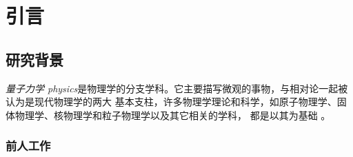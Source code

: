 \chapter{引言}


\section{研究背景}

\emph{量子力学 physics}是物理学的分支学科。它主要描写微观的事物，与相对论一起被认为是现代物理学的两大
基本支柱，许多物理学理论和科学，如原子物理学、固体物理学、核物理学和粒子物理学以及其它相关的学科，
都是以其为基础 \parencite{曾谨言2013量子力学,feynman2011feynman}。



\subsection{前人工作}

